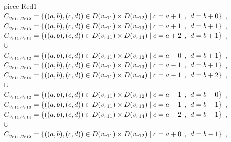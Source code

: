 \\ piece Red1 
\\$C_{v_{r11},v_{r12}}=\{((a,b),(c,d))\in D(v_{r11}) \times D(v_{r12})\mid c = a + 1\hspace{1ex} , \hspace{1ex}  d = b + 0 \}$ , 
\\$C_{v_{r11},v_{r13}}=\{((a,b),(c,d))\in D(v_{r11}) \times D(v_{r13})\mid c = a + 1\hspace{1ex} , \hspace{1ex}  d = b + 1 \}$ , 
\\$C_{v_{r11},v_{r14}}=\{((a,b),(c,d))\in D(v_{r11}) \times D(v_{r14})\mid c = a + 2\hspace{1ex} , \hspace{1ex}  d = b + 1 \}$ , 
\\$\cup$
\\$C_{v_{r11},v_{r12}}=\{((a,b),(c,d))\in D(v_{r11}) \times D(v_{r12})\mid c = a - 0\hspace{1ex} , \hspace{1ex}  d = b + 1 \}$ , 
\\$C_{v_{r11},v_{r13}}=\{((a,b),(c,d))\in D(v_{r11}) \times D(v_{r13})\mid c = a - 1\hspace{1ex} , \hspace{1ex}  d = b + 1 \}$ , 
\\$C_{v_{r11},v_{r14}}=\{((a,b),(c,d))\in D(v_{r11}) \times D(v_{r14})\mid c = a - 1\hspace{1ex} , \hspace{1ex}  d = b + 2 \}$ , 
\\$\cup$
\\$C_{v_{r11},v_{r12}}=\{((a,b),(c,d))\in D(v_{r11}) \times D(v_{r12})\mid c = a - 1\hspace{1ex} , \hspace{1ex}  d = b - 0 \}$ , 
\\$C_{v_{r11},v_{r13}}=\{((a,b),(c,d))\in D(v_{r11}) \times D(v_{r13})\mid c = a - 1\hspace{1ex} , \hspace{1ex}  d = b - 1 \}$ , 
\\$C_{v_{r11},v_{r14}}=\{((a,b),(c,d))\in D(v_{r11}) \times D(v_{r14})\mid c = a - 2\hspace{1ex} , \hspace{1ex}  d = b - 1 \}$ , 
\\$\cup$
\\$C_{v_{r11},v_{r12}}=\{((a,b),(c,d))\in D(v_{r11}) \times D(v_{r12})\mid c = a + 0\hspace{1ex} , \hspace{1ex}  d = b - 1 \}$ , 
